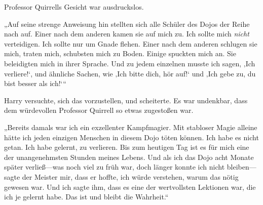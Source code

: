 Professor Quirrells Gesicht war ausdruckslos.

„Auf seine strenge Anweisung hin stellten sich alle Schüler des Dojos der Reihe nach auf. Einer nach dem anderen kamen sie auf mich zu. Ich sollte mich \emph{nicht} verteidigen. Ich sollte nur um Gnade flehen. Einer nach dem anderen schlugen sie mich, traten mich, schubsten mich zu Boden. Einige spuckten mich an. Sie beleidigten mich in ihrer Sprache. Und zu jedem einzelnen musste ich sagen, ‚Ich verliere!‘, und ähnliche Sachen, wie ‚Ich bitte dich, hör auf!‘ und ‚Ich gebe zu, du bist besser als ich!‘“

Harry versuchte, sich das vorzustellen, und scheiterte. Es war undenkbar, dass dem würdevollen Professor Quirrell so etwas zugestoßen war.

„Bereits damals war ich ein exzellenter Kampfmagier. Mit stabloser Magie alleine hätte ich jeden einzigen Menschen in diesem Dojo töten können. Ich habe es nicht getan. Ich habe gelernt, zu verlieren. Bis zum heutigen Tag ist es für mich eine der unangenehmsten Stunden meines Lebens. Und als ich das Dojo acht Monate später verließ—was noch viel zu früh war, doch länger konnte ich nicht bleiben—sagte der Meister mir, dass er hoffte, ich würde verstehen, warum das nötig gewesen war. Und ich sagte ihm, dass es eine der wertvollsten Lektionen war, die ich je gelernt habe. Das ist und bleibt die Wahrheit.“

